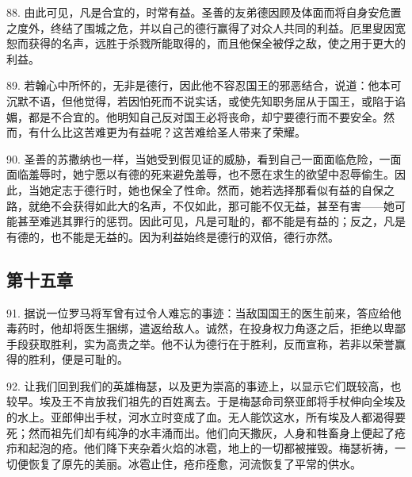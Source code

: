 88. 由此可见，凡是合宜的，时常有益。圣善的友弟德因顾及体面而将自身安危置之度外，终结了围城之危，并以自己的德行赢得了对众人共同的利益。厄里叟因宽恕而获得的名声，远胜于杀戮所能取得的，而且他保全被俘之敌，使之用于更大的利益。\par

89. 若翰心中所怀的，无非是德行，因此他不容忍国王的邪恶结合，说道：他本可沉默不语，但他觉得，若因怕死而不说实话，或使先知职务屈从于国王，或陷于谄媚，都是不合宜的。他明知自己反对国王必将丧命，却宁要德行而不要安全。然而，有什么比这苦难更为有益呢？这苦难给圣人带来了荣耀。\par

90. 圣善的苏撒纳也一样，当她受到假见证的威胁，看到自己一面面临危险，一面面临羞辱时，她宁愿以有德的死来避免羞辱，也不愿在求生的欲望中忍辱偷生。因此，当她定志于德行时，她也保全了性命。然而，她若选择那看似有益的自保之路，就绝不会获得如此大的名声，不仅如此，那可能不仅无益，甚至有害——她可能甚至难逃其罪行的惩罚。因此可见，凡是可耻的，都不能是有益的；反之，凡是有德的，也不能是无益的。因为利益始终是德行的双倍，德行亦然。\par


\subsection{第十五章}

\par

91. 据说一位罗马将军曾有过令人难忘的事迹：当敌国国王的医生前来，答应给他毒药时，他却将医生捆绑，遣返给敌人。诚然，在投身权力角逐之后，拒绝以卑鄙手段获取胜利，实为高贵之举。他不认为德行在于胜利，反而宣称，若非以荣誉赢得的胜利，便是可耻的。\par

92. 让我们回到我们的英雄梅瑟，以及更为崇高的事迹上，以显示它们既较高，也较早。埃及王不肯放我们祖先的百姓离去。于是梅瑟命司祭亚郎将手杖伸向全埃及的水上。亚郎伸出手杖，河水立时变成了血。无人能饮这水，所有埃及人都渴得要死；然而祖先们却有纯净的水丰涌而出。他们向天撒灰，人身和牲畜身上便起了疮疖和起泡的疮。他们降下夹杂着火焰的冰雹，地上的一切都被摧毁。梅瑟祈祷，一切便恢复了原先的美丽。冰雹止住，疮疖痊愈，河流恢复了平常的供水。\par

